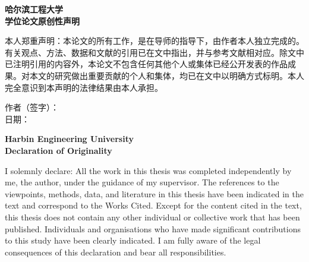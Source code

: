 
\clearpage
\thispagestyle{empty}
\begin{center}
{\fontsize{16pt}{24pt}\selectfont\bfseries 哈尔滨工程大学}\\[0.5cm]
{\fontsize{16pt}{24pt}\selectfont\bfseries 学位论文原创性声明}
\end{center}

\vspace{1cm}

\fontsize{12pt}{22pt}\selectfont
\setlength{\parindent}{2em}

本人郑重声明：本论文的所有工作，是在导师的指导下，由作者本人独立完成的。有关观点、方法、数据和文献的引用已在文中指出，并与参考文献相对应。除文中已注明引用的内容外，本论文不包含任何其他个人或集体已经公开发表的作品成果。对本文的研究做出重要贡献的个人和集体，均已在文中以明确方式标明。本人完全意识到本声明的法律结果由本人承担。

\vspace{2cm}

\begin{flushright}
作者（签字）：\underline{\makebox[4cm]{}}\\[0.5cm]
日期：\underline{}
\end{flushright}

\clearpage
\thispagestyle{empty}
\begin{center}
{\fontsize{16pt}{24pt}\selectfont\bfseries Harbin Engineering University}\\[0.5cm]
{\fontsize{16pt}{24pt}\selectfont\bfseries Declaration of Originality}
\end{center}

\vspace{1cm}

\fontsize{12pt}{22pt}\selectfont
\setlength{\parindent}{2em}

I solemnly declare: All the work in this thesis was completed independently by me, the author, under the guidance of my supervisor. The references to the viewpoints, methods, data, and literature in this thesis have been indicated in the text and correspond to the Works Cited. Except for the content cited in the text, this thesis does not contain any other individual or collective work that has been published. Individuals and organisations who have made significant contributions to this study have been clearly indicated. I am fully aware of the legal consequences of this declaration and bear all responsibilities.

